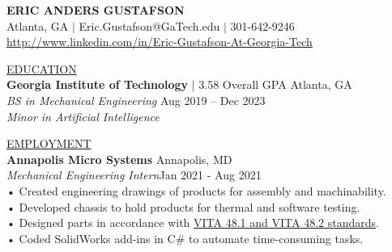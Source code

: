 \documentclass{article}
\begin{document}
\title{}
\author{}
\date{}
\maketitle

\thispagestyle{empty} %


\begin{center}\textbf{\Huge ERIC ANDERS GUSTAFSON}\\
\large\linkcolor Atlanta, GA  $|$ {\color{blue} Eric.Gustafson@GaTech.edu} $|$  301-642-9246\\
\linkcolor\href{http://www.linkedin.com/in/Eric-Gustafson-At-Georgia-Tech}{http://www.linkedin.com/in/Eric-Gustafson-At-Georgia-Tech}\\
\end{center}

\underline{\Large E\normalsize DUCATION\qquad\qquad\qquad\qquad\qquad\qquad\qquad\qquad\qquad\qquad\qquad\qquad\qquad\qquad\qquad\qquad\qquad\qquad\qquad\qquad\quad}\\
\large \textbf{Georgia Institute of Technology} $|$ 3.58 Overall GPA    \hfill Atlanta, GA\\
\large\textit{BS in Mechanical Engineering}     \hfill Aug 2019 – Dec 2023\\
\large\textit{Minor in Artificial Intelligence}\\

\vspace{3mm} %

\underline{\Large E\normalsize MPLOYMENT\qquad\qquad\qquad\qquad\qquad\qquad\qquad\qquad\qquad\qquad\qquad\qquad\qquad\qquad\qquad\qquad\qquad\qquad\qquad\quad}\\
\large\textbf{Annapolis Micro Systems} \hfill Annapolis, MD\\
\large\textit{Mechanical Engineering Intern}\hfill Jan 2021 - Aug 2021\\
\qquad • \quad Created engineering drawings of products for assembly and machinability.\\
\qquad • \quad Developed chassis to hold products for thermal and software testing. \\
\qquad • \quad Designed parts in accordance with \linkcolor\href{https://www.vita.com/VITA-Announcements/9204245}{VITA 48.1 and VITA 48.2 standards}. \\ %
\qquad • \quad Coded SolidWorks add-ins in C\# to automate time-consuming tasks.\\
\vspace{3mm} %
\end{document}
